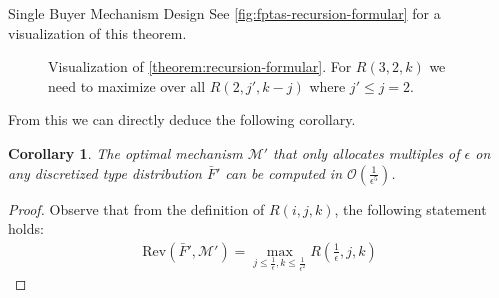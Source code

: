 \documentclass[11pt,a4paper]{article}
\newtheorem{corollary}[theorem]{Corollary}
\newcommand{\1}[1]{\mbox{\rm\bf 1}_{#1}}
\begin{document}
\begin{section}{Single Buyer Mechanism Design}
 See \autoref{fig:fptas-recursion-formular} for a visualization of this theorem.

 \begin{figure}[htp!]
     \centering
     \caption{
         Visualization of \autoref{theorem:recursion-formular}. For $R(3,2,k)$ we need to maximize over all $R(2, j', k-j)$ where $j' \leq j = 2$.
     }
     \label{fig:fptas-recursion-formular}
 \end{figure}

 From this we can directly deduce the following corollary.

 \begin{corollary}
     The optimal mechanism $\mathcal{M}'$ that only allocates multiples of $\epsilon$ on any discretized type distribution $\bar{F}'$
     can be computed in $\mathcal{O}\left(\frac{1}{\epsilon^5}\right)$.
 \end{corollary}
 \begin{proof}
     Observe that from the definition of $R(i,j,k)$, the following statement holds:
     \begin{align*}
         \mathrm{Rev}(\bar{F}', \mathcal{M}') = \max_{j \leq \frac{1}{\epsilon}, k \leq \frac{1}{\epsilon^2}} R\left(\frac{1}{\epsilon}, j, k\right)
     \end{align*}


\end{proof}
\end{section}
\end{document}
